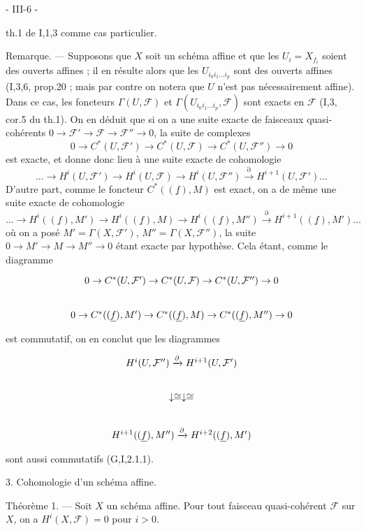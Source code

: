 
- III-6 -

th.1 de I,1,3 comme cas particulier.

Remarque. — Supposons que $X$ soit un schéma affine et que les $U_i = X_{f_i}$ soient des ouverts affines ; il en résulte alors que les $U_{i_0 i_1 \dots i_p}$ sont des ouverts affines (I,3,6, prop.20 ; mais par contre on notera que $U$ n'est pas nécessairement affine). Dans ce cas, les foncteurs $\Gamma(U, \mathcal{F})$ et $\Gamma(U_{i_0 i_1 \dots i_p}, \mathcal{F})$ sont exacts en $\mathcal{F}$ (I,3, cor.5 du th.1). On en déduit que si on a une suite exacte de faisceaux quasi-cohérents $0 \to \mathcal{F}' \to \mathcal{F} \to \mathcal{F}'' \to 0$, la suite de complexes
$$0 \to C^*(U, \mathcal{F}') \to C^*(U, \mathcal{F}) \to C^*(U, \mathcal{F}'') \to 0$$
est exacte, et donne donc lieu à une suite exacte de cohomologie
$$\dots \to H^i(U, \mathcal{F}') \to H^i(U, \mathcal{F}) \to H^i(U, \mathcal{F}'') \xrightarrow{\partial} H^{i+1}(U, \mathcal{F}') \dots$$
D'autre part, comme le foncteur $C^*((\underline{f}), M)$ est exact, on a de même une suite exacte de cohomologie
$$\dots \to H^i((\underline{f}), M') \to H^i((\underline{f}), M) \to H^i((\underline{f}), M'') \xrightarrow{\partial} H^{i+1}((\underline{f}), M') \dots$$
où on a posé $M' = \Gamma(X, \mathcal{F}')$, $M'' = \Gamma(X, \mathcal{F}'')$, la suite $0 \to M' \to M \to M'' \to 0$ étant exacte par hypothèse. Cela étant, comme le diagramme
$$\begin{tikzcd}
0 \to C^*(U, \mathcal{F}') \to C^*(U, \mathcal{F}) \to C^*(U, \mathcal{F}'') \to 0 \\
0 \to C^*((\underline{f}), M') \to C^*((\underline{f}), M) \to C^*((\underline{f}), M'') \to 0
\end{tikzcd}$$
est commutatif, on en conclut que les diagrammes
$$\begin{tikzcd}
H^i(U, \mathcal{F}'') \xrightarrow{\partial} H^{i+1}(U, \mathcal{F}') \\
\downarrow \cong \downarrow \cong \\
H^{i+1}((\underline{f}), M'') \xrightarrow{\partial} H^{i+2}((\underline{f}), M')
\end{tikzcd}$$
sont aussi commutatifs (G,I,2.1.1).

3. Cohomologie d'un schéma affine.

Théorème 1. — Soit $X$ un schéma affine. Pour tout faisceau quasi-cohérent $\mathcal{F}$ sur $X$, on a $H^i(X, \mathcal{F}) = 0$ pour $i > 0$.

